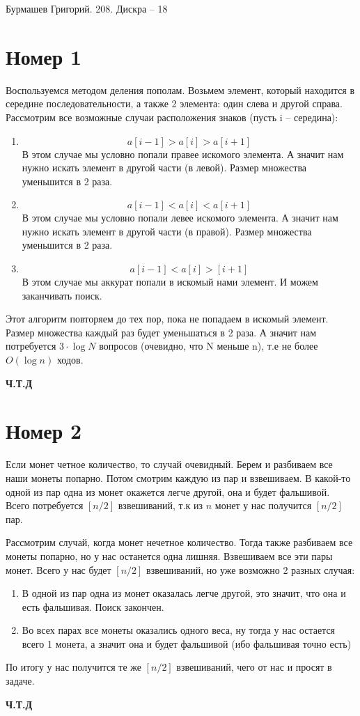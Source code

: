 \documentclass[a4paper,12pt]{article}
\author{Бурмашев Григорий, БПМИ-208}
\title{}
\date{\today}
\begin{document}
\begin{center}
Бурмашев Григорий. 208. Дискра -- 18
\end{center}
\section*{Номер 1}
Воспользуемся методом деления пополам. Возьмем элемент, который находится в середине последовательности, а также 2 элемента: один слева и другой справа. Рассмотрим все возможные случаи расположения знаков (пусть i -- середина):
\begin{enumerate}
\item
\[
a\left[ i - 1 \right] > a\left[i \right] > a\left[i + 1\right]
\]
В этом случае мы условно попали правее искомого элемента. А значит нам нужно искать элемент в другой части (в левой). Размер множества уменьшится в 2 раза.
\item
\[
a\left[i - 1\right] < a\left[i\right] < a\left[i+ 1\right]
\]
В этом случае мы условно попали левее искомого элемента. А значит нам нужно искать элемент в другой части (в правой). Размер множества уменьшится в 2 раза.
\item
\[
a\left[i - 1\right] < a\left[i\right] > \left[i + 1\right]
\]
В этом случае мы аккурат попали в искомый нами элемент. И можем заканчивать поиск.
\end{enumerate}
Этот алгоритм повторяем до тех пор, пока не попадаем в искомый элемент. Размер множества каждый раз будет уменьшаться в 2 раза. А значит нам потребуется $3 \cdot \log N$ вопросов (очевидно, что N меньше n), т.е не более $O\left(\log n\right)$ ходов.
\begin{center}
\textbf{Ч.Т.Д} 
\end{center}
\section*{Номер 2}
Если монет четное количество, то случай очевидный. Берем и разбиваем все наши монеты попарно. Потом смотрим каждую из пар и взвешиваем. В какой-то одной из пар одна из монет окажется легче другой, она и будет фальшивой. Всего потребуется $[n / 2]$ взвешиваний, т.к из $n$ монет у нас получится $[n / 2]$ пар.

Рассмотрим случай, когда монет нечетное количество. Тогда также разбиваем все монеты попарно, но у нас останется одна лишняя. Взвешиваем все эти пары монет. Всего у нас будет $[n / 2]$ взвешиваний, но уже возможно 2 разных случая:
\begin{enumerate}
\item
В одной из пар одна из монет оказалась легче другой, это значит, что она и есть фальшивая. Поиск закончен.
\item Во всех парах все монеты оказались одного веса, ну тогда у нас остается всего 1 монета, а значит она и будет фальшивой (ибо фальшивая точно есть)
\end{enumerate}
По итогу у нас получится те же $[n / 2]$ взвешиваний, чего от нас и просят в задаче.
\begin{center}
\textbf{Ч.Т.Д} 
\end{center}
\end{document}

